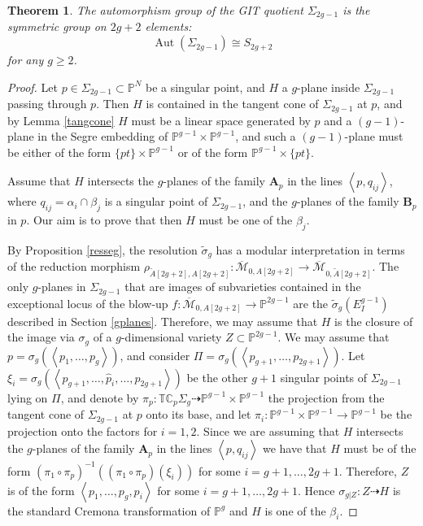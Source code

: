 \documentclass[a4paper,10pt]{amsart}
\newtheorem{thm}{Theorem}[section]
\theoremstyle{definition}
\newcommand{\Aut}{\operatorname{Aut}}
\newcommand{\cM}{\overline{\mathcal{M}}}
\begin{document}
\begin{thm}\label{thaut}
The automorphism group of the GIT quotient $\Sigma_{2g-1}$ is the symmetric group on $2g+2$ elements:
$$\Aut(\Sigma_{2g-1})\cong S_{2g+2}$$
for any $g\geq 2$.
\end{thm} 
\begin{proof}
Let $p\in \Sigma_{2g-1}\subset\mathbb{P}^N$ be a singular point, and $H$ a $g$-plane inside $\Sigma_{2g-1}$ passing through $p$. Then $H$ is contained in the tangent cone of $\Sigma_{2g-1}$ at $p$, and by Lemma \ref{tangcone} $H$ must be a linear space generated by $p$ and a $(g-1)$-plane in the Segre embedding of $\mathbb{P}^{g-1}\times \mathbb{P}^{g-1}$, and such a $(g-1)$-plane must be either of the form $\{pt\}\times \mathbb{P}^{g-1}$ or of the form $\mathbb{P}^{g-1}\times\{pt\}$.

Assume that $H$ intersects the $g$-planes of the family $\textbf{A}_p$ in the lines $\left\langle p, q_{ij}\right\rangle$, where $q_{ij} = \alpha_i\cap \beta_j$ is a singular point of $\Sigma_{2g-1}$, and the $g$-planes of the family $\textbf{B}_p$ in $p$. Our aim is to prove that then $H$ must be one of the $\beta_j$.

By Proposition \ref{resseg}, the resolution $\widetilde{\sigma}_g$ has a modular interpretation in terms of the reduction morphism $\rho_{\widetilde{A}[2g+2],A[2g+2]}:\cM_{0,A[2g+2]}\rightarrow \cM_{0,\widetilde{A}[2g+2]}$. The only $g$-planes in $\Sigma_{2g-1}$ that are images of subvarieties contained in the exceptional locus of the blow-up $f:\cM_{0,A[2g+2]}\rightarrow\mathbb{P}^{2g-1}$ are the $\widetilde{\sigma}_g(E_I^{g-1})$ described in Section \ref{gplanes}. Therefore, we may assume that $H$ is the closure of the image via $\sigma_g$ of a $g$-dimensional variety $Z\subset\mathbb{P}^{2g-1}$. We may assume that $p = \sigma_g(\left\langle p_1,\dots,p_g\right\rangle)$, and consider $\Pi = \sigma_g(\left\langle p_{g+1},\dots,p_{2g+1}\right\rangle)$. Let $\xi_i = \sigma_g(\left\langle p_{g+1},\dots,\hat{p}_i,\dots,p_{2g+1}\right\rangle)$ be the other $g+1$ singular points of $\Sigma_{2g-1}$ lying on $\Pi$, and denote by $\pi_p:\mathbb{TC}_p\Sigma_g\dasharrow \mathbb{P}^{g-1}\times\mathbb{P}^{g-1}$ the projection from the tangent cone of $\Sigma_{2g-1}$ at $p$ onto its base, and let $\pi_i:\mathbb{P}^{g-1}\times\mathbb{P}^{g-1}\rightarrow\mathbb{P}^{g-1}$ be the projection onto the factors for $i = 1,2$. Since we are assuming that $H$ intersects the $g$-planes of the family $\textbf{A}_p$ in the lines $\left\langle p, q_{ij}\right\rangle$ we have that $H$ must be of the form $(\pi_1\circ\pi_p)^{-1}((\pi_1\circ\pi_p)(\xi_i))$ for some $i = g+1,\dots,2g+1$. Therefore, $Z$ is of the form $\left\langle p_1,\dots,p_g,p_i\right\rangle$ for some $i = g+1,\dots,2g+1$. Hence $\sigma_{g|Z}:Z\dasharrow H$ is the standard Cremona transformation of $\mathbb{P}^g$ and $H$ is one of the $\beta_i$.


\end{proof}
\end{document}
